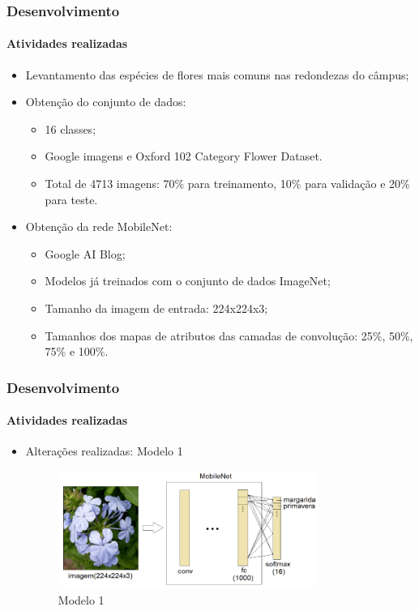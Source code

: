 \documentclass{beamer}
\begin{document}
    
    \begin{frame}
      \frametitle{Desenvolvimento}
      \framesubtitle{Atividades realizadas}      
      \begin{itemize}
        \item<1-> Levantamento das espécies de flores mais comuns nas redondezas do câmpus;\medskip
	    \item<2-> Obtenção do conjunto de dados:
	    		\begin{itemize}
	    			\item<3-> 16 classes;
	    			\item<4-> Google imagens e Oxford 102 Category Flower Dataset.
	    			\item<5-> Total de 4713 imagens: 70\% para treinamento, 10\% para validação e 20\% para teste. \medskip
	    		\end{itemize}
        \item<6-> Obtenção da rede MobileNet: 
        		\begin{itemize}
	    			\item<7-> Google AI Blog;
	    			\item<7-> Modelos já treinados com o conjunto de dados ImageNet; 
				\item<8-> Tamanho da imagem de entrada: 224x224x3;
				\item<8-> Tamanhos dos mapas de atributos das camadas de convolução: 25\%, 50\%, 75\% e 100\%.\medskip    		
	    		\end{itemize}     
      \end{itemize}
    \end{frame}
    
     \begin{frame}
      \frametitle{Desenvolvimento}
      \framesubtitle{Atividades realizadas}      
      \begin{itemize}
        \item<1-> Alterações realizadas: Modelo 1
        		 \begin{figure}[hbt]
      		 	\begin{center}
      				\includegraphics[width=0.8\textwidth]{img/model1.png}
      			\end{center}
      			\caption{Modelo 1~\cite{computer-1209641}}
      		\end{figure}
      \end{itemize}
    \end{frame}
    
\end{document}
